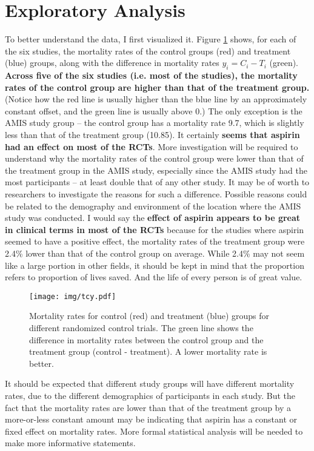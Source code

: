 \documentclass{../../tex_template/asaproc}
\begin{document}
\section{Exploratory Analysis}
To better understand the data, I first visualized it.  Figure \ref{fig:tcy}
shows, for each of the six studies, the mortality rates of the control groups
(red) and treatment (blue) groups, along with the difference in mortality rates
$y_i = C_i-T_i$ (green).  \textbf{Across five of the six studies (i.e. most of
the studies), the mortality rates of the control group are higher than that of
the treatment group.} (Notice how the red line is usually higher than the blue
line by an approximately constant offset, and the green line is usually above
0.) The only exception is the AMIS study group -- the control group has a
mortality rate 9.7, which is slightly less than that of the treatment group
(10.85).  It certainly \textbf{seems that aspirin had an effect on most of the
RCTs}. More investigation will be required to understand why the mortality
rates of the control group were lower than that of the treatment group in the
AMIS study, especially since the AMIS study had the most participants -- at
least double that of any other study. It may be of worth to researchers to
investigate the reasons for such a difference. Possible reasons could be
related to the demography and environment of the location where the AMIS study
was conducted.  I would say the \textbf{effect of aspirin appears to be great
in clinical terms in most of the RCTs} because for the studies where aspirin
seemed to have a positive effect, the mortality rates of the treatment group
were 2.4\% lower than that of the control group on average. While 2.4\% may not
seem like a large portion in other fields, it should be kept in mind that the
proportion refers to proportion of lives saved. And the life of every person is
of great value.\\

\begin{figure}%
  \texttt{[image: img/tcy.pdf]}
  \caption{\small Mortality rates for control (red) and treatment (blue) groups
  for different randomized control trials. The green line shows the difference
  in mortality rates between the control group and the treatment group (control -
  treatment). A lower mortality rate is better.}
  \label{fig:tcy}
\end{figure}

It should be expected that different study groups will have different mortality
rates, due to the different demographics of participants in each study. But the
fact that the mortality rates are lower than that of the treatment group by a
more-or-less constant amount may be indicating that aspirin has a constant or
fixed effect on mortality rates.  More formal statistical analysis will be
needed to make more informative statements.\\
\end{document}
